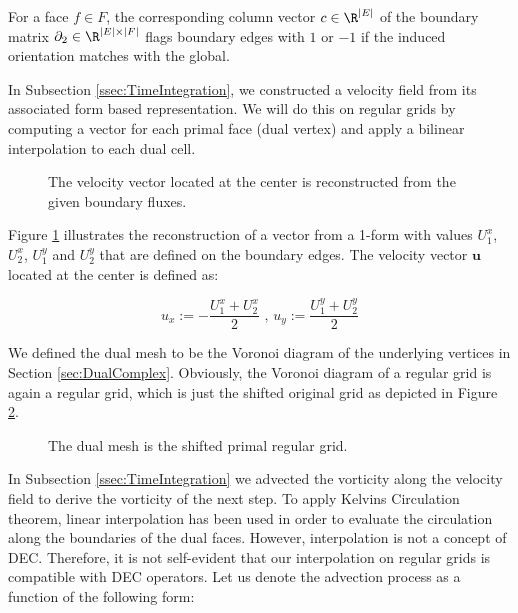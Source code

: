 For a face $f \in F$, the corresponding column vector $c \in \R^{|E|}$ of the boundary matrix $\partial_2 \in \R^{|E|\times|F|}$ flags
boundary edges with $1$ or $-1$ if the induced orientation matches with the global.

\newpage
{}
In Subsection \ref{ssec:TimeIntegration}, we constructed a velocity field from its associated form based representation.%
We will do this on regular grids by computing a vector for each primal face (dual vertex) and apply a bilinear interpolation to each dual cell.

\begin{figure}[h!]
	\centering
 	
	\caption[Velocity field reconstruction]{The velocity vector located at the center is reconstructed from the given boundary fluxes.}
	\label{fig:RegGridInt}
\end{figure}

Figure \ref{fig:RegGridInt} illustrates the reconstruction of a vector from a 1-form with values $U_1^x$, $U_2^x$, $U_1^y$ and $U_2^y$ that are defined on the boundary edges. 
The velocity vector $\mathbf{u}$ located at the center is defined as:

\begin{equation}
\label{eq:RedGridVelVector}
u_x := - \frac{U_1^x + U_2^x}{ 2 }  \text{ , } u_y := \frac{U_1^y + U_2^y}{ 2 }
\end{equation}

\newpage
{}

We defined the dual mesh to be the Voronoi diagram of the underlying vertices in Section \ref{sec:DualComplex}.
Obviously, the Voronoi diagram of a regular grid is again a regular grid, which is just the shifted original grid as depicted in Figure \ref{fig:RegGridDual}.

\begin{figure}[htbp]
	\centering
 	
	\caption{The dual mesh is the shifted primal regular grid.}
	\label{fig:RegGridDual}
\end{figure}

\label{ssec:ModifiedHodge}
In Subsection \ref{ssec:TimeIntegration} we advected the vorticity along the velocity field to derive the vorticity of the next step.
To apply Kelvins Circulation theorem, linear interpolation has been used in order to evaluate the circulation along the boundaries of the dual faces.
However, interpolation is not a concept of DEC. Therefore, it is not self-evident that our interpolation on regular grids is compatible with DEC operators.
Let us denote the advection process as a function of the following form:

